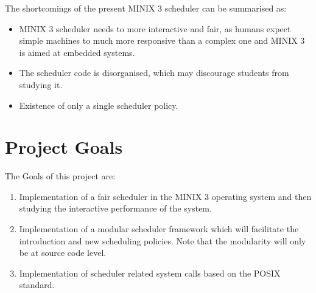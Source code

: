 The shortcomings of the present MINIX 3 scheduler can be summarised as:

\begin{itemize}
\item MINIX 3 scheduler needs to more interactive and fair, as humans expect simple machines to much more responsive than
a complex one and MINIX 3 is aimed at embedded systems.
\item The scheduler code is disorganised, which may discourage students from studying it.
\item Existence of only a single scheduler policy.
\end{itemize}

\chapter{Project Goals}

The Goals of this project are:
\begin{enumerate}
\item Implementation of a fair scheduler in the MINIX 3 operating system and then 
studying the interactive performance of the system.
\item Implementation of a modular scheduler framework which will facilitate the introduction
and new scheduling policies. Note that the modularity will only be at source code level.
\item Implementation of scheduler related system calls based on the POSIX~\cite{ie04} standard.
\end{enumerate}

